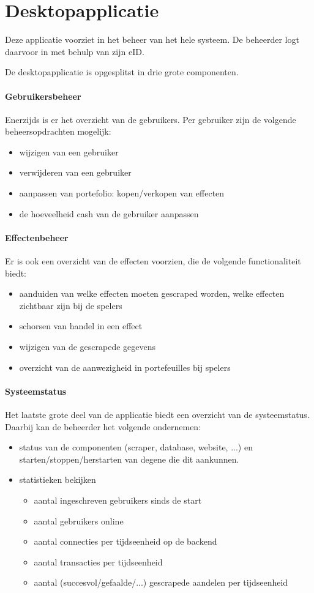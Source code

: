 \section{Desktopapplicatie}
Deze applicatie voorziet in het beheer van het hele systeem. De beheerder logt daarvoor in met behulp van zijn eID.

De desktopapplicatie is opgesplitst in drie grote componenten.
\paragraph{Gebruikersbeheer}Enerzijds is er het overzicht van de gebruikers. Per gebruiker zijn de volgende beheersopdrachten mogelijk: 
\begin{itemize}
	\item{wijzigen van een gebruiker}
	\item{verwijderen van een gebruiker}
	\item{aanpassen van portefolio: kopen/verkopen van effecten}
	\item{de hoeveelheid cash van de gebruiker aanpassen}
\end{itemize}

\paragraph{Effectenbeheer}Er is ook een overzicht van de effecten voorzien, die de volgende functionaliteit biedt:
\begin{itemize}
	\item{aanduiden van welke effecten moeten gescraped worden, welke effecten zichtbaar zijn bij de spelers}
	\item{schorsen van handel in een effect}
	\item{wijzigen van de gescrapede gegevens}
	\item{overzicht van de aanwezigheid in portefeuilles bij spelers}
\end{itemize}

\paragraph{Systeemstatus}Het laatste grote deel van de applicatie biedt een overzicht van de systeemstatus. Daarbij kan de beheerder het volgende ondernemen:
\begin{itemize}
\item{status van de componenten (scraper, database, website, ...) en starten/stoppen/herstarten van degene die dit aankunnen.}
\item{statistieken bekijken}
	\begin{itemize}
	\item{aantal ingeschreven gebruikers sinds de start}
	\item{aantal gebruikers online}
	\item{aantal connecties per tijdseenheid op de backend}
	\item{aantal transacties per tijdseenheid}
	\item{aantal (succesvol/gefaalde/...) gescrapede aandelen per tijdseenheid}
	\end{itemize}
\end{itemize}

